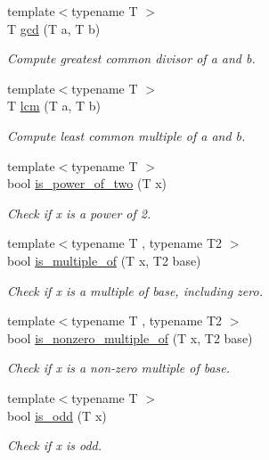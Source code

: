 \begin{DoxyCompactItemize}
{\footnotesize template$<$typename T $>$ }\\T \hyperlink{namespacetlz_a4fe5757a830e199f84d229eee11f616e}{gcd} (T a, T b)
\begin{DoxyCompactList}\small\item\em Compute greatest common divisor of {\ttfamily a} and {\ttfamily b}. \end{DoxyCompactList}\item 
{\footnotesize template$<$typename T $>$ }\\T \hyperlink{namespacetlz_aec6e2158ce198aa20a8493fde3d3b552}{lcm} (T a, T b)
\begin{DoxyCompactList}\small\item\em Compute least common multiple of {\ttfamily a} and {\ttfamily b}. \end{DoxyCompactList}\item 
{\footnotesize template$<$typename T $>$ }\\bool \hyperlink{namespacetlz_a8c93d873dafb82720113a1c31516e264}{is\+\_\+power\+\_\+of\+\_\+two} (T x)
\begin{DoxyCompactList}\small\item\em Check if {\ttfamily x} is a power of 2. \end{DoxyCompactList}\item 
{\footnotesize template$<$typename T , typename T2 $>$ }\\bool \hyperlink{namespacetlz_a7f6ddfeecf23b5d803f1e2a72f0db470}{is\+\_\+multiple\+\_\+of} (T x, T2 base)
\begin{DoxyCompactList}\small\item\em Check if {\ttfamily x} is a multiple of {\ttfamily base}, including zero. \end{DoxyCompactList}\item 
{\footnotesize template$<$typename T , typename T2 $>$ }\\bool \hyperlink{namespacetlz_a0d277a545c57a035169803cec14fce43}{is\+\_\+nonzero\+\_\+multiple\+\_\+of} (T x, T2 base)
\begin{DoxyCompactList}\small\item\em Check if {\ttfamily x} is a non-\/zero multiple of {\ttfamily base}. \end{DoxyCompactList}\item 
{\footnotesize template$<$typename T $>$ }\\bool \hyperlink{namespacetlz_ac73d8d9d67bb9b8b86e5ab9aba237b2b}{is\+\_\+odd} (T x)
\begin{DoxyCompactList}\small\item\em Check if {\ttfamily x} is odd. \end{DoxyCompactList}\item 

\end{DoxyCompactItemize}
